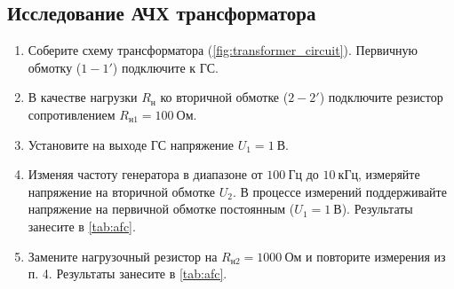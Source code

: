 \subsection{Исследование АЧХ трансформатора}
\begin{enumerate}
    \item Соберите схему трансформатора (\cref{fig:transformer_circuit}). Первичную обмотку ($1-1'$) подключите к ГС.
    \item В качестве нагрузки $R_\text{н}$ ко вторичной обмотке ($2-2'$) подключите резистор сопротивлением $R_{\text{н}1} = 100~\text{Ом}$.
    \item Установите на выходе ГС напряжение $U_1 = 1~\text{В}$.
    \item Изменяя частоту генератора в диапазоне от $100~\text{Гц}$ до $10~\text{кГц}$, измеряйте напряжение на вторичной обмотке $U_2$. В процессе измерений поддерживайте напряжение на первичной обмотке постоянным ($U_1 = 1~\text{В}$). Результаты занесите в \cref{tab:afc}.
    \item Замените нагрузочный резистор на $R_{\text{н}2} = 1000~\text{Ом}$ и повторите измерения из п. 4. Результаты занесите в \cref{tab:afc}.
\end{enumerate}

